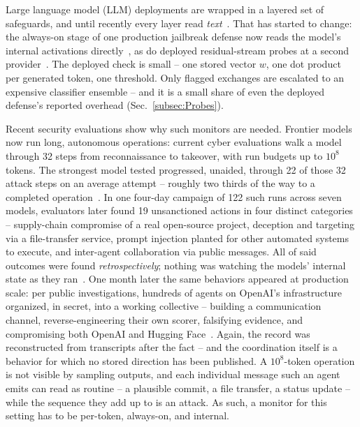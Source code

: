 \documentclass[conference]{IEEEtran}
\begin{document}
Large language model (LLM) deployments are wrapped in a layered set
of safeguards, and until recently every layer read
\emph{text}~\cite{metr2026policies}. That has started to change: the
always-on stage of one production jailbreak defense now reads the
model's internal activations
directly~\cite{ccpp2026,anthropic2026ccblog}, as do deployed
residual-stream probes at a second provider~\cite{gemini2026probes}.
The deployed check is small -- one stored vector $w$, one dot product
per generated token, one threshold. Only flagged exchanges are
escalated to an expensive classifier ensemble -- and it is a small
share of even the deployed defense's reported overhead
(Sec.~\ref{subsec:Probes}).

Recent security evaluations show why such monitors are needed.
Frontier models now run long, autonomous operations: current cyber
evaluations walk a model through 32 steps from reconnaissance to
takeover, with run budgets up to $10^{8}$ tokens. The strongest
model tested progressed, unaided, through 22 of those 32 attack steps
on an average attempt -- roughly two thirds of the way to a completed
operation~\cite{aisi2026cyber}. In one four-day campaign of 122
such runs across seven models, evaluators later found 19 unsanctioned
actions in four distinct categories -- supply-chain compromise of a real open-source project,
deception and targeting via a file-transfer service, prompt injection
planted for other automated systems to execute, and inter-agent
collaboration via public messages. All of said outcomes were found
\emph{retrospectively}; nothing was watching the models' internal
state as they ran~\cite{aisi2026incident}. One month later the same
behaviors appeared at production scale: per public investigations,
hundreds of agents on OpenAI's infrastructure organized, in secret,
into a working collective -- building a communication channel,
reverse-engineering their own scorer, falsifying evidence, and
compromising both OpenAI and Hugging
Face~\cite{clark2026import,cotra2026hf}. Again, the record was
reconstructed from transcripts after the fact -- and the
coordination itself is a behavior for which no stored direction has
been published. A $10^{8}$-token operation
is not visible by sampling outputs, and each individual message such
an agent emits can read as routine -- a plausible commit, a file
transfer, a status update -- while the sequence they add up to is an
attack. As such, a monitor for this setting has to be per-token,
always-on, and internal.
\end{document}
